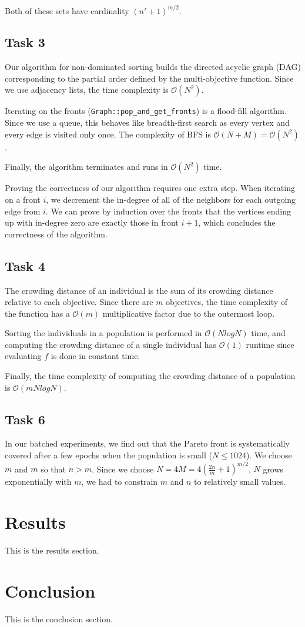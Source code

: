 \documentclass[english]{article}
\begin{document}
Both of these sets have cardinality $(n' + 1)^{m / 2}$.

\subsection{Task 3}

Our algorithm for non-dominated sorting builds the directed acyclic graph (DAG)
corresponding to the partial order defined by the multi-objective function.
Since we use adjacency lists, the time complexity is $\mathcal{O}(N^2)$.

Iterating on the fronts (\texttt{Graph::pop\_and\_get\_fronts}) is a flood-fill
algorithm. Since we use a queue, this behaves like breadth-first search as every
vertex and every edge is visited only once. The complexity of BFS is
$\mathcal{O}(N + M) = \mathcal{O}(N^2)$.

Finally, the algorithm terminates and runs in $\mathcal{O}(N^2)$ time.

Proving the correctness of our algorithm requires one extra step. When iterating
on a front $i$, we decrement the in-degree of all of the neighbors for each
outgoing edge from $i$. We can prove by induction over the fronts that the
vertices ending up with in-degree zero are exactly those in front $i+1$, which
concludes the correctness of the algorithm.


\subsection{Task 4}

The crowding distance of an individual is the sum of its crowding distance
relative to each objective. Since there are $m$ objectives, the time complexity
of the function has a $\mathcal{O}(m)$ multiplicative factor due to the
outermost loop.

Sorting the individuals in a population is performed in $\mathcal{O}(N log N)$
time, and computing the crowding distance of a single individual has
$\mathcal{O}(1)$ runtime since evaluating $f$ is done in constant time.

Finally, the time complexity of computing the crowding distance of a population
is $\mathcal{O}(m N log N)$.

\subsection{Task 6}

In our batched experiments, we find out that the Pareto front is systematically
covered after a few epochs when the population is small ($N \le 1024$). We
choose $m$ and $m$ so that $n > m$. Since we choose $N = 4 M = 4 \left(\frac{2
        n}{m} + 1 \right)^{m / 2}$, $N$ grows exponentially with $m$, we had to
constrain $m$ and $n$ to relatively small values.


\section{Results}
This is the results section.

\section{Conclusion}
This is the conclusion section.

\end{document}
